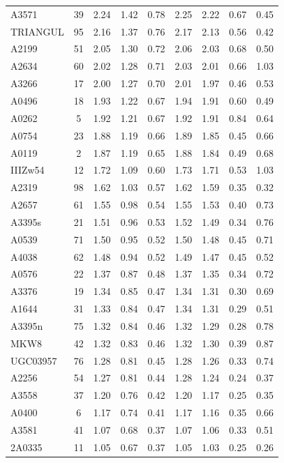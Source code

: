 \documentclass[10pt,aps,pra,reprint,amsmath,amsfonts,amssymb,showpacs,nofootinbib,floatfix]{revtex4-1}
\begin{document}
\begin{table}
\begin{minipage}{2.0\columnwidth}
\begin{tabular}{l c c c c c c c c}
A3571 & 39 & 2.24 & 1.42 & 0.78 & 2.25 & 2.22 & 0.67 & 0.45 \\
TRIANGUL & 95 & 2.16 & 1.37 & 0.76 & 2.17 & 2.13 & 0.56 & 0.42 \\
A2199 & 51 & 2.05 & 1.30 & 0.72 & 2.06 & 2.03 & 0.68 & 0.50 \\
A2634 & 60 & 2.02 & 1.28 & 0.71 & 2.03 & 2.01 & 0.66 & 1.03 \\
A3266 & 17 & 2.00 & 1.27 & 0.70 & 2.01 & 1.97 & 0.46 & 0.53 \\
A0496 & 18 & 1.93 & 1.22 & 0.67 & 1.94 & 1.91 & 0.60 & 0.49 \\
A0262 & 5 & 1.92 & 1.21 & 0.67 & 1.92 & 1.91 & 0.84 & 0.64 \\
A0754 & 23 & 1.88 & 1.19 & 0.66 & 1.89 & 1.85 & 0.45 & 0.66 \\
A0119 & 2 & 1.87 & 1.19 & 0.65 & 1.88 & 1.84 & 0.49 & 0.68 \\
IIIZw54 & 12 & 1.72 & 1.09 & 0.60 & 1.73 & 1.71 & 0.53 & 1.03 \\
A2319 & 98 & 1.62 & 1.03 & 0.57 & 1.62 & 1.59 & 0.35 & 0.32 \\
A2657 & 61 & 1.55 & 0.98 & 0.54 & 1.55 & 1.53 & 0.40 & 0.73 \\
A3395s & 21 & 1.51 & 0.96 & 0.53 & 1.52 & 1.49 & 0.34 & 0.76 \\
A0539 & 71 & 1.50 & 0.95 & 0.52 & 1.50 & 1.48 & 0.45 & 0.71 \\
A4038 & 62 & 1.48 & 0.94 & 0.52 & 1.49 & 1.47 & 0.45 & 0.52 \\
A0576 & 22 & 1.37 & 0.87 & 0.48 & 1.37 & 1.35 & 0.34 & 0.72 \\
A3376 & 19 & 1.34 & 0.85 & 0.47 & 1.34 & 1.31 & 0.30 & 0.69 \\
A1644 & 31 & 1.33 & 0.84 & 0.47 & 1.34 & 1.31 & 0.29 & 0.51 \\
A3395n & 75 & 1.32 & 0.84 & 0.46 & 1.32 & 1.29 & 0.28 & 0.78 \\
MKW8 & 42 & 1.32 & 0.83 & 0.46 & 1.32 & 1.30 & 0.39 & 0.87 \\
UGC03957 & 76 & 1.28 & 0.81 & 0.45 & 1.28 & 1.26 & 0.33 & 0.74 \\
A2256 & 54 & 1.27 & 0.81 & 0.44 & 1.28 & 1.24 & 0.24 & 0.37 \\
A3558 & 37 & 1.20 & 0.76 & 0.42 & 1.20 & 1.17 & 0.25 & 0.35 \\
A0400 & 6 & 1.17 & 0.74 & 0.41 & 1.17 & 1.16 & 0.35 & 0.66 \\
A3581 & 41 & 1.07 & 0.68 & 0.37 & 1.07 & 1.06 & 0.33 & 0.51 \\
2A0335 & 11 & 1.05 & 0.67 & 0.37 & 1.05 & 1.03 & 0.25 & 0.26 \\

\end{tabular}
\end{minipage}
\end{table}
\end{document}
